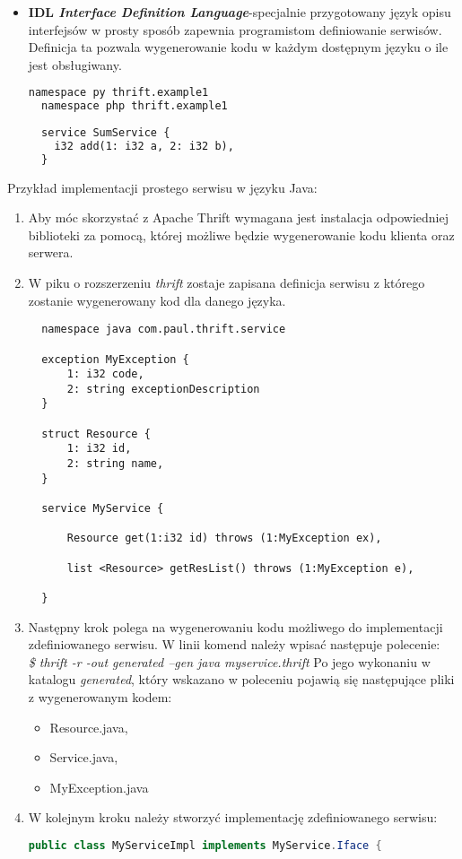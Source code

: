 \begin{itemize}
  \item \textbf{IDL \textit{Interface Definition Language}}-specjalnie przygotowany język opisu interfejsów w prosty sposób zapewnia programistom definiowanie serwisów. Definicja ta pozwala wygenerowanie kodu w każdym dostępnym języku o ile jest obsługiwany.
        \begin{lstlisting}[language=XML, caption=Przykład definicji metody w języku IDL]
  namespace py thrift.example1
  namespace php thrift.example1
 
  service SumService {
    i32 add(1: i32 a, 2: i32 b),
  }
  \end{lstlisting}
\end{itemize}
Przykład implementacji prostego serwisu w języku Java:
\begin{enumerate}
  \item Aby móc skorzystać z Apache Thrift wymagana jest instalacja odpowiedniej biblioteki za pomocą, której możliwe będzie wygenerowanie kodu klienta oraz serwera.
  \item W piku o rozszerzeniu \textit{thrift} zostaje zapisana definicja serwisu z którego zostanie wygenerowany kod dla danego języka.
        \begin{lstlisting}
  namespace java com.paul.thrift.service
    
  exception MyException {
      1: i32 code,
      2: string exceptionDescription
  }
    
  struct Resource {
      1: i32 id,
      2: string name,
  }
    
  service MyService {
    
      Resource get(1:i32 id) throws (1:MyException ex),
    
      list <Resource> getResList() throws (1:MyException e),
    
  }
  \end{lstlisting}
  \item Następny krok polega na wygenerowaniu kodu możliwego do implementacji zdefiniowanego serwisu. W linii komend należy wpisać następuje polecenie:\\
        \textit{\$ thrift -r -out generated --gen java myservice.thrift}
        Po jego wykonaniu w katalogu \textit{generated}, który wskazano w poleceniu pojawią się następujące pliki z wygenerowanym kodem:
        \begin{itemize}
          \item Resource.java,
          \item Service.java,
          \item MyException.java
        \end{itemize}
  \item W kolejnym kroku należy stworzyć implementację zdefiniowanego serwisu:
        \begin{lstlisting}[language=java, caption=Implementacja kodu usługi]
  public class MyServiceImpl implements MyService.Iface {


\end{lstlisting}
\end{enumerate}
